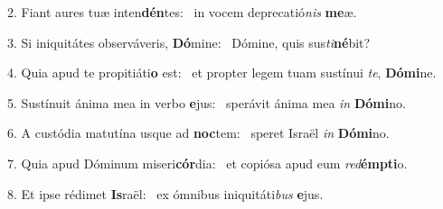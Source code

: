 2. Fiant aures tuæ inten\textbf{dén}tes: \ast\  in vocem deprecatió\textit{nis} \textbf{me}æ.\

3. Si iniquitátes observáveris, \textbf{Dó}mine: \ast\  Dómine, quis sus\textit{ti}\textbf{né}bit?\

4. Quia apud te propitiáti\textbf{o} est: \ast\  et propter legem tuam sustínui \textit{te}, \textbf{Dó}\textbf{mi}ne.\

5. Sustínuit ánima mea in verbo \textbf{e}jus: \ast\  sperávit ánima mea \textit{in} \textbf{Dó}\textbf{mi}no.\

6. A custódia matutína usque ad \textbf{noc}tem: \ast\  speret Israël \textit{in} \textbf{Dó}\textbf{mi}no.\

7. Quia apud Dóminum miseri\textbf{cór}dia: \ast\  et copiósa apud eum \textit{red}\textbf{émp}\textbf{ti}o.\

8. Et ipse rédimet \textbf{Is}raël: \ast\  ex ómnibus iniquitáti\textit{bus} \textbf{e}jus.\


